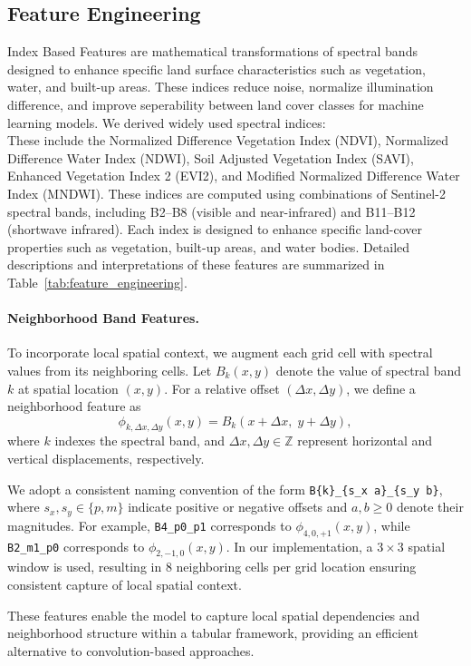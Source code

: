 \documentclass[11pt]{article}
\begin{document}
\subsection{Feature Engineering}
Index Based Features are mathematical transformations of spectral bands designed to enhance specific land surface characteristics such as vegetation, water, and built-up areas. These indices reduce noise, normalize illumination difference, and improve seperability between land cover classes for machine learning models. 
We derived widely used spectral indices:\\
These include the Normalized Difference Vegetation Index (NDVI), Normalized Difference Water Index (NDWI), Soil Adjusted Vegetation Index (SAVI), Enhanced Vegetation Index 2 (EVI2), and Modified Normalized Difference Water Index (MNDWI). These indices are computed using combinations of Sentinel-2 spectral bands, including B2–B8 (visible and near-infrared) and B11–B12 (shortwave infrared). Each index is designed to enhance specific land-cover properties such as vegetation, built-up areas, and water bodies. Detailed descriptions and interpretations of these features are summarized in Table~\ref{tab:feature_engineering}.

\paragraph{Neighborhood Band Features.}
To incorporate local spatial context, we augment each grid cell with spectral values from its neighboring cells. Let $B_k(x,y)$ denote the value of spectral band $k$ at spatial location $(x,y)$. For a relative offset $(\Delta x, \Delta y)$, we define a neighborhood feature as
\[
\phi_{k,\Delta x,\Delta y}(x,y) = B_k(x+\Delta x,\; y+\Delta y),
\]
where $k$ indexes the spectral band, and $\Delta x, \Delta y \in \mathbb{Z}$ represent horizontal and vertical displacements, respectively.

We adopt a consistent naming convention of the form \texttt{B\{k\}\_\{s\_x a\}\_\{s\_y b\}}, where $s_x, s_y \in \{p,m\}$ indicate positive or negative offsets and $a, b \geq 0$ denote their magnitudes. For example, \texttt{B4\_p0\_p1} corresponds to $\phi_{4,0,+1}(x,y)$, while \texttt{B2\_m1\_p0} corresponds to $\phi_{2,-1,0}(x,y)$. In our implementation, a $3 \times 3$ spatial window is used, resulting in 8 neighboring cells per grid location ensuring consistent capture of local spatial context.

These features enable the model to capture local spatial dependencies and neighborhood structure within a tabular framework, providing an efficient alternative to convolution-based approaches.
\end{document}

